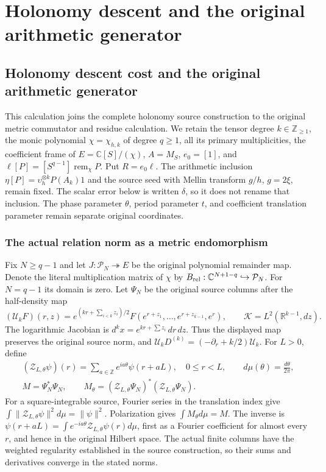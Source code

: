 \begingroup

\section{Holonomy descent and the original arithmetic generator}


\subsection{Holonomy descent cost and the original arithmetic generator}
\label{sec:holonomy-generator-control}

This calculation joins the complete holonomy source construction to the
original metric commutator and residue calculation. We retain the tensor
degree $k\in\mathbb Z_{\ge1}$, the monic polynomial $\chi=\chi_{h,k}$ of
degree $q\ge1$, all its primary multiplicities, the coefficient frame of
$E=\mathbb C[S]/(\chi)$, $A=M_S$, $e_0=[1]$, and
$\ell[P]=[S^{q-1}]\operatorname{rem}_{\chi}P$. Put $R=e_0\ell$.
The arithmetic inclusion $\eta[P]=\upsilon_h^{\otimes k}P(A_k)1$ and
the source seed with Mellin transform $g/h$, $g=2\xi$, remain fixed.
The scalar error below is written $\delta$, so it does not rename that
inclusion. The phase parameter $\theta$, period parameter $t$, and
coefficient translation parameter remain separate original coordinates.

\subsubsection{The actual relation norm as a metric endomorphism}

Fix $N\ge q-1$ and let $J:\mathcal P_N\twoheadrightarrow E$ be the
original polynomial remainder map. Denote the literal multiplication
matrix of $\chi$ by $B_{\rm rel}:\mathbb C^{N+1-q}\hookrightarrow
\mathcal P_N$. For $N=q-1$ its domain is zero. Let $\Psi_N$ be the
original source columns after the half-density map
\[
 (\mathcal U_k F)(r,z)=e^{(kr+\sum_{i<k}z_i)/2}
 F(e^{r+z_1},\ldots,e^{r+z_{k-1}},e^r),\qquad
 \mathcal K=L^2(\mathbb R^{k-1},dz).
 \tag{HG1}
\]
The logarithmic Jacobian is $d^kx=e^{kr+\sum z_i}\,dr\,dz$.
Thus the displayed map preserves the original source norm, and
$\mathcal U_kD^{(k)}=(-\partial_r+k/2)\mathcal U_k$.
For $L>0$, define
\[
\begin{gathered}
 (\mathcal Z_{L,\theta}\psi)(r)=
       \sum_{a\in\mathbb Z}e^{ia\theta}\psi(r+aL),\quad 0\le r<L,
 \qquad d\mu(\theta)=\frac{d\theta}{2\pi},\\
 M=\Psi_N^*\Psi_N,\qquad
 M_\theta=(\mathcal Z_{L,\theta}\Psi_N)^*
                    (\mathcal Z_{L,\theta}\Psi_N).
\end{gathered}\tag{HG2}
\]
For a square-integrable source, Fourier series in the translation index
give $\int\|\mathcal Z_{L,\theta}\psi\|^2d\mu=\|\psi\|^2$.
Polarization gives $\int M_\theta d\mu=M$. The inverse is
$\psi(r+aL)=\int e^{-ia\theta}\mathcal Z_{L,\theta}\psi(r)d\mu$,
first as a Fourier coefficient for almost every $r$, and hence in the
original Hilbert space. The actual finite columns have the weighted
regularity established in the source construction, so their sums and
derivatives converge in the stated norms.

